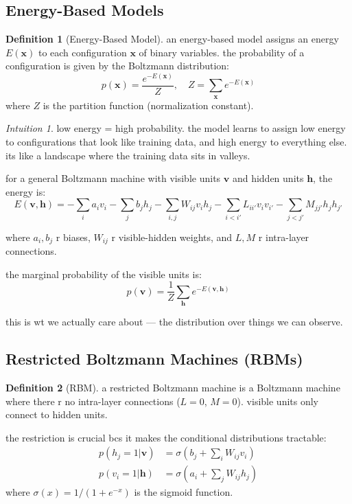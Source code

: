 \documentclass[11pt,a4paper]{article}
\theoremstyle{definition}
\newtheorem{definition}{Definition}[section]
\theoremstyle{remark}
\newtheorem*{intuition}{Intuition}
\begin{document}
\subsection{Energy-Based Models}

\begin{definition}[Energy-Based Model]
an energy-based model assigns an energy $E(\mathbf{x})$ to each configuration $\mathbf{x}$ of binary variables. the probability of a configuration is given by the Boltzmann distribution:
\[
p(\mathbf{x}) = \frac{e^{-E(\mathbf{x})}}{Z}, \quad Z = \sum_{\mathbf{x}} e^{-E(\mathbf{x})}
\]
where $Z$ is the partition function (normalization constant).
\end{definition}

\begin{intuition}
low energy = high probability. the model learns to assign low energy to configurations that look like training data, and high energy to everything else. its like a landscape where the training data sits in valleys.
\end{intuition}

for a general Boltzmann machine with visible units $\mathbf{v}$ and hidden units $\mathbf{h}$, the energy is:
\[
E(\mathbf{v}, \mathbf{h}) = -\sum_{i} a_i v_i - \sum_{j} b_j h_j - \sum_{i,j} W_{ij} v_i h_j - \sum_{i<i'} L_{ii'} v_i v_{i'} - \sum_{j<j'} M_{jj'} h_j h_{j'}
\]

where $a_i, b_j$ r biases, $W_{ij}$ r visible-hidden weights, and $L, M$ r intra-layer connections.

the marginal probability of the visible units is:
\[
p(\mathbf{v}) = \frac{1}{Z} \sum_{\mathbf{h}} e^{-E(\mathbf{v}, \mathbf{h})}
\]

this is wt we actually care about --- the distribution over things we can observe.

\subsection{Restricted Boltzmann Machines (RBMs)}

\begin{definition}[RBM]
a restricted Boltzmann machine is a Boltzmann machine where there r no intra-layer connections ($L = 0$, $M = 0$). visible units only connect to hidden units.
\end{definition}

the restriction is crucial bcs it makes the conditional distributions tractable:
\begin{align}
p(h_j = 1 | \mathbf{v}) &= \sigma\left(b_j + \sum_i W_{ij} v_i\right) \\
p(v_i = 1 | \mathbf{h}) &= \sigma\left(a_i + \sum_j W_{ij} h_j\right)
\end{align}
where $\sigma(x) = 1/(1 + e^{-x})$ is the sigmoid function.
\end{document}
